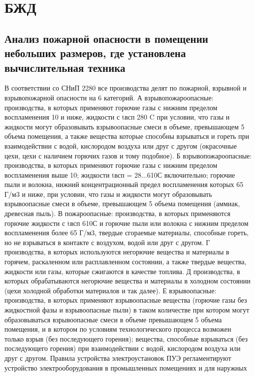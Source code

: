\section{БЖД}

\subsection{Анализ пожарной опасности в помещении небольших размеров, где установлена вычислительная техника}

В соответствии со СНиП 2280 все производства делят по пожарной, взрывной и взрывопожарной опасности на 6 категорий.
А взрывопожароопасные: производства, в которых применяют горючие газы с нижним пределом воспламенения 10 и ниже,
жидкости с tвсп 280 C при условии, что газы и жидкости могут образовывать взрывоопасные смеси в объеме, превышающем
5 объема помещения, а также вещества которые способны взрываться и гореть при взаимодействии с водой, кислородом
воздуха или друг с другом (окрасочные цехи, цехи с наличием горючих газов и тому подобное). Б взрывопожароопасные:
производства, в которых применяют горючие газы с нижним пределом воспламенения выше 10; жидкости tвсп = 28...610С
включительно; горючие пыли и волокна, нижний концентрационный предел воспламенения которых 65 Г/м3 и ниже, при условии,
что газы и жидкости могут образовывать взрывоопасные смеси в объеме, превышающем 5 объема помещения (аммиак,
древесная пыль). В пожароопасные: производства, в которых применяются горючие жидкости с tвсп 610С и горючие пыли или
волокна с нижним пределом воспламенения более 65 Г/м3, твердые сгораемые материалы, способные гореть, но не
взрываться в контакте с воздухом, водой или друг с другом. Г производства, в которых используются негорючие
вещества и материалы в горячем, раскаленном или расплавленном состоянии, а также твердые вещества, жидкости или
газы, которые сжигаются в качестве топлива. Д производства, в которых обрабатываются негорючие вещества и материалы
в холодном состоянии (цехи холодной обработки материалов и так далее). Е взрывоопасные: производства, в которых
применяют взрывоопасные вещества (горючие газы без жидкостной фазы и взрывоопасные пыли) в таком количестве при
котором могут образовываться взрывоопасные смеси в объеме превышающем 5 объема помещения, и в котором по условиям
технологического процесса возможен только взрыв (без последующего горения); вещества, способные взрываться
(без последующего горения) при взаимодействии с водой, кислородом воздуха или друг с другом. Правила устройства
электроустановок ПУЭ регламентируют устройство электрооборудования в промышленных помещениях и для наружных
